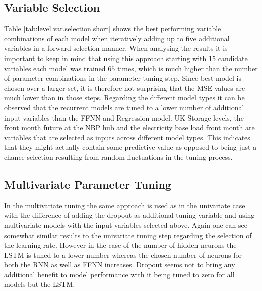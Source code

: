 \subsection{Variable Selection}
Table \ref{tab:level.var.selection.short} shows the best performing variable combinations of each model when iteratively adding up to five additional variables in a forward selection manner. When analysing the results it is important to keep in mind that using this approach starting with $15$ candidate variables each model was trained $65$ times, which is much higher than the number of parameter combinations in the parameter tuning step. Since best model is chosen over a larger set, it is therefore not surprising that the MSE values are much lower than in those steps. Regarding the different model types it can be observed that the recurrent models are tuned to a lower number of additional input variables than the FFNN and Regression model. UK Storage levels, the front month future at the NBP hub and the electricity base load front month are variables that are selected as inputs across different model types. This indicates that they might actually contain some predictive value as opposed to being just a chance selection resulting from random fluctuations in the tuning process.

\subsection{Multivariate Parameter Tuning}
In the multivariate tuning the same approach is used as in the univariate case with the difference of adding the dropout as additional tuning variable and using multivariate models with the input variables selected above. Again one can see somewhat similar results to the univariate tuning step regarding the selection of the  learning rate. However in the case of the number of hidden neurons the LSTM is tuned to a lower number whereas the chosen number of neurons for both the RNN as well as FFNN increases. Dropout seems not to bring any additional benefit to model performance with it being tuned to zero for all models but the LSTM.

